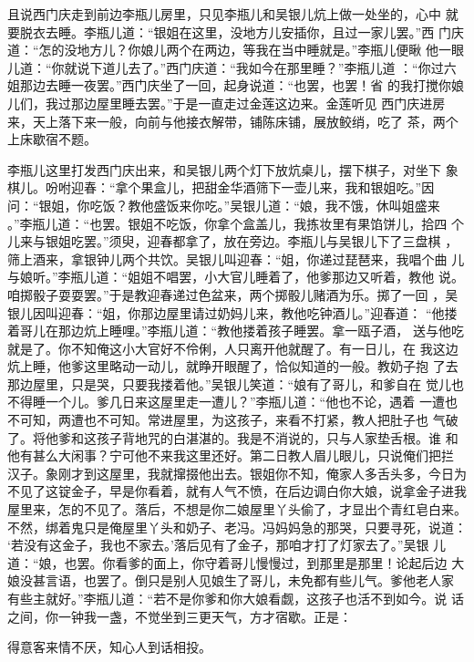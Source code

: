 且说西门庆走到前边李瓶儿房里，只见李瓶儿和吴银儿炕上做一处坐的，心中
就要脱衣去睡。李瓶儿道：“银姐在这里，没地方儿安插你，且过一家儿罢。”西
门庆道：“怎的没地方儿？你娘儿两个在两边，等我在当中睡就是。”李瓶儿便瞅
他一眼儿道：“你就说下道儿去了。”西门庆道：“我如今在那里睡？”李瓶儿道
：“你过六姐那边去睡一夜罢。”西门庆坐了一回，起身说道：“也罢，也罢！省
的我打搅你娘儿们，我过那边屋里睡去罢。”于是一直走过金莲这边来。金莲听见
西门庆进房来，天上落下来一般，向前与他接衣解带，铺陈床铺，展放鲛绡，吃了
茶，两个上床歇宿不题。

李瓶儿这里打发西门庆出来，和吴银儿两个灯下放炕桌儿，摆下棋子，对坐下
象棋儿。吩咐迎春：“拿个果盒儿，把甜金华酒筛下一壶儿来，我和银姐吃。”因
问：“银姐，你吃饭？教他盛饭来你吃。”吴银儿道：“娘，我不饿，休叫姐盛来
。”李瓶儿道：“也罢。银姐不吃饭，你拿个盒盖儿，我拣妆里有果馅饼儿，拾四
个儿来与银姐吃罢。”须臾，迎春都拿了，放在旁边。李瓶儿与吴银儿下了三盘棋
，筛上酒来，拿银钟儿两个共饮。吴银儿叫迎春：“姐，你递过琵琶来，我唱个曲
儿与娘听。”李瓶儿道：“姐姐不唱罢，小大官儿睡着了，他爹那边又听着，教他
说。咱掷骰子耍耍罢。”于是教迎春递过色盆来，两个掷骰儿赌酒为乐。掷了一回
，吴银儿因叫迎春：“姐，你那边屋里请过奶妈儿来，教他吃钟酒儿。”迎春道：
“他搂着哥儿在那边炕上睡哩。”李瓶儿道：“教他搂着孩子睡罢。拿一瓯子酒，
送与他吃就是了。你不知俺这小大官好不伶俐，人只离开他就醒了。有一日儿，在
我这边炕上睡，他爹这里略动一动儿，就睁开眼醒了，恰似知道的一般。教奶子抱
了去那边屋里，只是哭，只要我搂着他。”吴银儿笑道：“娘有了哥儿，和爹自在
觉儿也不得睡一个儿。爹几日来这屋里走一遭儿？”李瓶儿道：“他也不论，遇着
一遭也不可知，两遭也不可知。常进屋里，为这孩子，来看不打紧，教人把肚子也
气破了。将他爹和这孩子背地咒的白湛湛的。我是不消说的，只与人家垫舌根。谁
和他有甚么大闲事？宁可他不来我这里还好。第二日教人眉儿眼儿，只说俺们把拦
汉子。象刚才到这屋里，我就撺掇他出去。银姐你不知，俺家人多舌头多，今日为
不见了这锭金子，早是你看着，就有人气不愤，在后边调白你大娘，说拿金子进我
屋里来，怎的不见了。落后，不想是你二娘屋里丫头偷了，才显出个青红皂白来。
不然，绑着鬼只是俺屋里丫头和奶子、老冯。冯妈妈急的那哭，只要寻死，说道：
‘若没有这金子，我也不家去。’落后见有了金子，那咱才打了灯家去了。”吴银
儿道：“娘，也罢。你看爹的面上，你守着哥儿慢慢过，到那里是那里！论起后边
大娘没甚言语，也罢了。倒只是别人见娘生了哥儿，未免都有些儿气。爹他老人家
有些主就好。”李瓶儿道：“若不是你爹和你大娘看觑，这孩子也活不到如今。说
话之间，你一钟我一盏，不觉坐到三更天气，方才宿歇。正是：

得意客来情不厌，知心人到话相投。